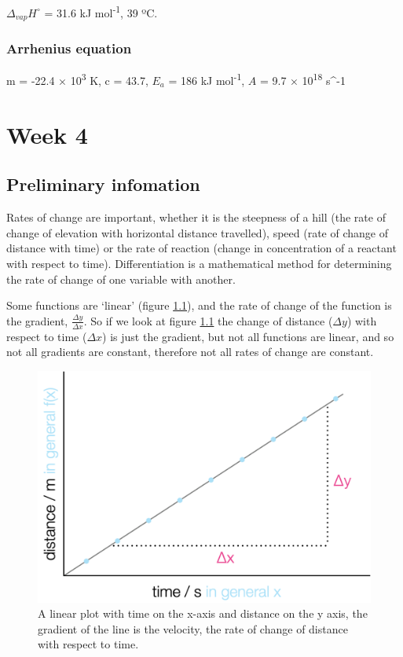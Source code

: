 \documentclass[
]{book}
\begin{document}
\(\Delta _{vap}H^\circ\) = 31.6 kJ mol\textsuperscript{-1}, 39 ºC.

\hypertarget{subsec:arrheniusans}{%
\subsection{Arrhenius equation}\label{subsec:arrheniusans}}

m = -22.4 × 10\textsuperscript{3} K, c = 43.7, \(E_a\) = 186 kJ mol\textsuperscript{-1}, \(A\) = 9.7 × 10\textsuperscript{18} s\^{}-1

\hypertarget{ch:Workshop4}{%
\chapter{Week 4}\label{ch:Workshop4}}

\hypertarget{sec:Prelim4}{%
\section{Preliminary infomation}\label{sec:Prelim4}}

Rates of change are important, whether it is the steepness of a hill (the rate of change of elevation with horizontal distance travelled), speed (rate of change of distance with time) or the rate of reaction (change in concentration of a reactant with respect to time). Differentiation is a mathematical method for determining the rate of change of one variable with another.

Some functions are `linear' (figure \ref{fig:linear}), and the rate of change of the function is the gradient, \(\frac{\Delta y}{\Delta x}\). So if we look at figure \ref{fig:linear} the change of distance (\(\Delta y\)) with respect to time (\(\Delta x\)) is just the gradient, but not all functions are linear, and so not all gradients are constant, therefore not all rates of change are constant.

\begin{figure}

{\centering \includegraphics[width=0.5\linewidth]{images/linearplot} 

}

\caption{A linear plot with time on the x-axis and distance on the y axis, the gradient of the line is the velocity, the rate of change of distance with respect to time.}\label{fig:linear}
\end{figure}
\end{document}
